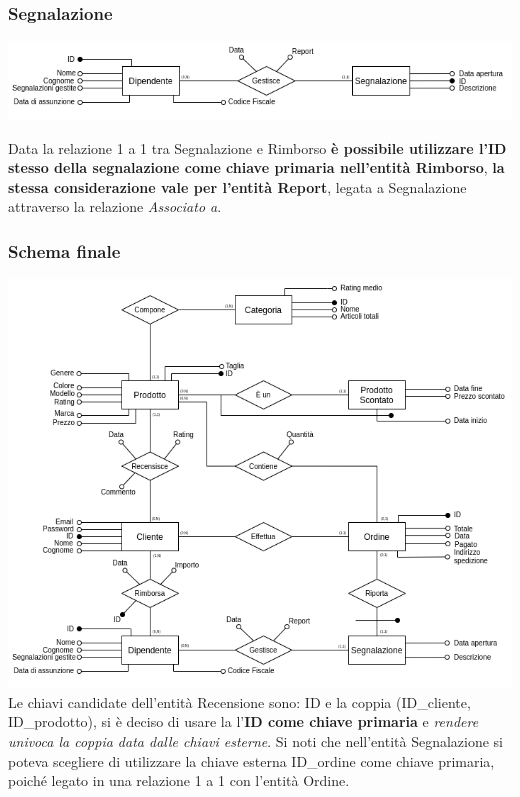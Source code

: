 \subsubsection{Segnalazione}
\begin{center}
\includegraphics[scale=0.60]{images/segnalazione.png}
\end{center}
Data la relazione 1 a 1 tra Segnalazione e Rimborso \textbf{è possibile utilizzare l'ID stesso della segnalazione come chiave primaria nell'entità Rimborso}, \textbf{la stessa considerazione vale per l'entità Report}, legata a Segnalazione attraverso la relazione \textit{Associato a}.
\subsubsection{Schema finale}
\includegraphics[scale=0.50]{images/schema_finale.png}
Le chiavi candidate dell'entità Recensione sono: ID e la coppia (ID\_cliente, ID\_prodotto), si è deciso di usare la l'\textbf{ID come chiave primaria} e\textit{ rendere univoca la coppia data dalle chiavi esterne}.
Si noti che nell'entità Segnalazione si poteva scegliere di utilizzare la chiave esterna ID\_ordine come chiave primaria, poiché legato in una relazione 1 a 1 con l'entità Ordine.